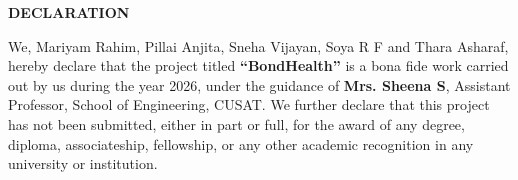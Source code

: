\clearpage
{}
{}
\thispagestyle{footeronly}
\begin{center}
{\Large \textbf{DECLARATION}}
\end{center}

\justifying
\noindent
We, Mariyam Rahim, Pillai Anjita, Sneha Vijayan, 
Soya R F and Thara Asharaf, hereby declare that the project titled 
\textbf{``BondHealth''} 
is a bona fide work carried out by us during the year 2026, 
under the guidance of \textbf{Mrs. Sheena S}, Assistant Professor, 
School of Engineering, CUSAT. We further declare that this project has not been submitted, 
either in part or full, for the award of any degree, diploma, 
associateship, fellowship, or any other academic recognition 
in any university or institution.

\vfill

\clearpage